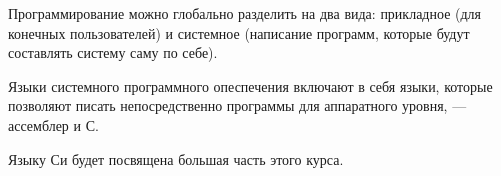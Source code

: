 Программирование можно глобально разделить на два вида: прикладное (для конечных пользователей) и системное (написание программ, которые будут составлять систему саму по себе).

Языки системного программного опеспечения включают в себя языки, которые позволяют писать непосредственно программы для аппаратного уровня, --- ассемблер и С.

Языку Си будет посвящена большая часть этого курса.